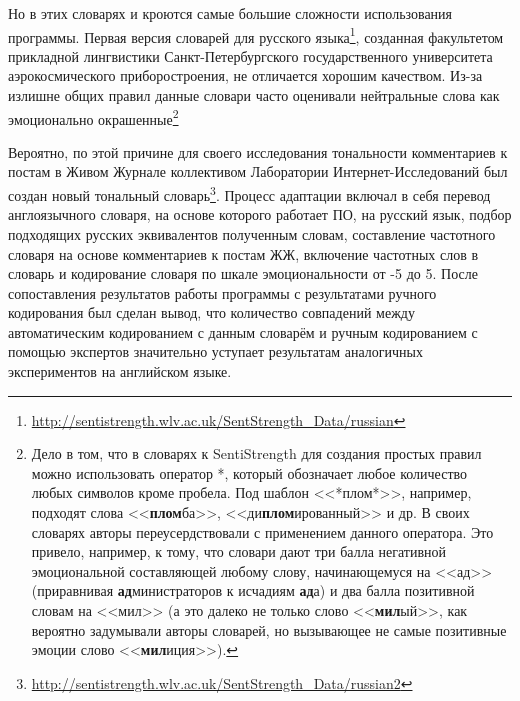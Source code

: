 Но в этих словарях и кроются самые большие сложности использования программы. Первая версия словарей для русского языка\footnote{\href{http://sentistrength.wlv.ac.uk/SentStrength\_Data/russian}{http://sentistrength.wlv.ac.uk/SentStrength\_Data/russian}}, созданная факультетом прикладной лингвистики Санкт-Петербургского государственного университета аэрокосмического приборостроения, не отличается хорошим качеством. Из-за излишне общих правил данные словари часто оценивали нейтральные слова как эмоционально окрашенные\footnote{
Дело в том, что в словарях к SentiStrength для создания простых правил можно использовать оператор *, который обозначает любое количество любых символов кроме пробела. Под шаблон <<*плом*>>, например, подходят слова <<\textbf{плом}ба>>, <<ди\textbf{плом}ированный>> и др. В своих словарях авторы переусердствовали с применением данного оператора. Это привело, например, к тому, что словари дают три балла негативной эмоциональной составляющей любому слову, начинающемуся на <<ад>> (приравнивая \textbf{ад}министраторов к исчадиям \textbf{ад}а) и два балла позитивной словам на <<мил>> (а это далеко не только слово <<\textbf{мил}ый>>, как вероятно задумывали авторы словарей, но вызывающее не самые позитивные эмоции слово <<\textbf{мил}иция>>).
}

\begin{comment}
Особенности SentiStrength:
Чтобы слова-отрицатели на русском работали без проблем, надо поставить перед ними английское слово

Слова с модулем тональности 1 не влияют на оценку (возможно они нужны, чтобы давать баллы, находясь рядом со словами-усилителями)
\end{comment}

Вероятно, по этой причине для своего исследования тональности комментариев к постам в Живом Журнале коллективом Лаборатории Интернет-Исследований был создан новый тональный словарь\footnote{\href{http://sentistrength.wlv.ac.uk/SentStrength\_Data/russian2}{http://sentistrength.wlv.ac.uk/SentStrength\_Data/russian2}}\cite{hse_sentistrength}. Процесс адаптации включал в себя перевод англоязычного словаря, на основе которого работает ПО, на русский язык, подбор подходящих русских эквивалентов полученным словам, составление частотного словаря на основе комментариев к постам ЖЖ, включение частотных слов в словарь и кодирование словаря по шкале эмоциональности от -5 до 5. После сопоставления результатов работы программы с результатами ручного кодирования был сделан вывод, что количество совпадений между автоматическим кодированием с данным словарём и ручным кодированием с помощью экспертов значительно уступает результатам аналогичных экспериментов на английском языке.

